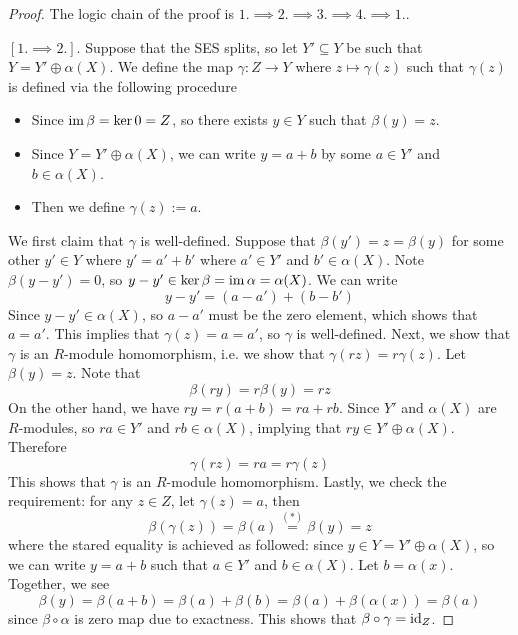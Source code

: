 \begin{proof}
    The logic chain of the proof is $1.\implies 2.\implies 3.\implies 4.\implies 1.$.

    $[1.\implies 2.]$. Suppose that the SES splits, so let $Y'\subseteq Y$ be such that $Y=Y'\oplus \alpha(X)$. We define the map $\gamma:Z\to Y$ where $z\mapsto \gamma(z)$ such that $\gamma(z)$ is defined via the following procedure
    \begin{itemize}
        \item Since $\operatorname{im} \beta = \ker 0 = Z$, so there exists $y\in Y$ such that $\beta(y)=z$.
        \item Since $Y=Y'\oplus \alpha(X)$, we can write $y=a+b$ by some $a\in Y'$ and $b\in \alpha(X)$.
        \item Then we define $\gamma(z):=a$.
    \end{itemize}
    We first claim that $\gamma$ is well-defined. Suppose that $\beta(y') = z = \beta(y)$ for some other $y'\in Y$ where $y'= a'+b'$ where $a'\in Y'$ and $b'\in \alpha(X)$. Note $\beta(y-y')=0$, so $y-y'\in \ker \beta = \operatorname{im} \alpha = \alpha(X)$. We can write
    \[y-y' = (a-a')+(b-b')\]
    Since $y-y'\in \alpha(X)$, so $a-a'$ must be the zero element, which shows that $a=a'$. This implies that $\gamma(z) = a = a'$, so $\gamma$ is well-defined. Next, we show that $\gamma$ is an $R$-module homomorphism, i.e. we show that $\gamma(rz) = r\gamma(z)$. Let $\beta(y)=z$. Note that 
    \[\beta(ry)=r\beta(y)=rz\]
    On the other hand, we have $ry=r(a+b) = ra+rb$. Since $Y'$ and $\alpha(X)$ are $R$-modules, so $ra\in Y'$ and $rb\in \alpha(X)$, implying that $ry\in Y'\oplus \alpha(X)$. Therefore
    \[\gamma(rz) = ra = r\gamma(z)\]
    This shows that $\gamma$ is an $R$-module homomorphism. Lastly, we check the requirement: for any $z\in Z$, let $\gamma(z)=a$, then 
    \[\beta(\gamma(z)) = \beta(a) \stackrel{(*)}= \beta(y)=z\]
    where the stared equality is achieved as followed: since $y\in Y=Y'\oplus\alpha(X)$, so we can write $y=a+b$ such that $a\in Y'$ and $b\in \alpha(X)$. Let $b=\alpha(x)$. Together, we see
    \[\beta(y) = \beta(a+b) = \beta(a) + \beta(b) = \beta(a) + \beta(\alpha(x)) = \beta(a)\]
    since $\beta\circ\alpha$ is zero map due to exactness. This shows that $\beta\circ \gamma = \operatorname{id}_Z$.
        

\end{proof}
